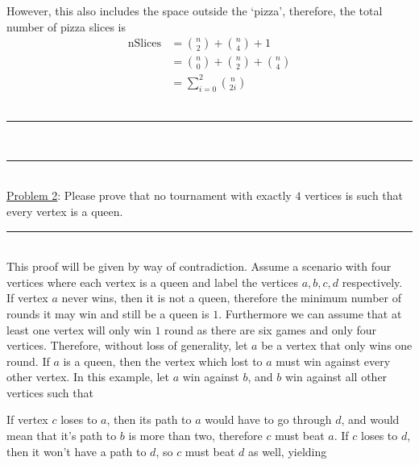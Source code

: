 \documentclass{article}
\newcommand{\problemsep}{\leavevmode\\[0.05in] \rule[\baselineskip/4]{\textwidth}{1pt} \\[0.005in] \rule[\baselineskip]{\textwidth}{1pt}\vspace{-\baselineskip}\leavevmode\\[0.05in]}
\newcommand{\statementsep}{\leavevmode\\[0.005in] \rule[\baselineskip/4]{\textwidth}{0.4pt}\leavevmode\\[0.005in]}
\begin{document}
However, this also includes the space outside the `pizza', therefore, the total number of pizza slices is 
\begin{equation*}\begin{aligned}
\text{nSlices} &= {n \choose 2} + {n \choose 4} + 1 \\
			   &= {n \choose 0} + {n \choose 2} + {n \choose 4}  \\
			   &= \sum_{i = 0}^2 {n \choose 2i}
\end{aligned}\end{equation*}
\problemsep
\noindent\underline{Problem 2}: 
Please prove that no tournament with exactly $4$ vertices is such that every 
vertex is a queen.
\statementsep
This proof will be given by way of contradiction.  Assume a scenario with four vertices where each vertex is a queen and label the vertices $a,b,c,d$ respectively. If vertex $a$ never wins, then it is not a queen, therefore the minimum number of rounds it may win and still be a queen is $1$. Furthermore we can assume that at least one vertex will only win $1$ round as there are six games and only four vertices. Therefore, without loss of generality, let $a$ be a vertex that only wins one round. If $a$ is a queen, then the vertex which lost to $a$ must win against every other vertex. In this example, let $a$ win against $b$, and $b$ win against all other vertices such that
\begin{center}
\end{center}
If vertex $c$ loses to $a$, then its path to $a$ would have to go through $d$, and would mean that it's path to $b$ is more than two, therefore $c$ must beat $a$. If $c$ loses to $d$, then it won't have a path to $d$, so $c$ must beat $d$ as well, yielding
\begin{center}
\end{center}
\end{document}
